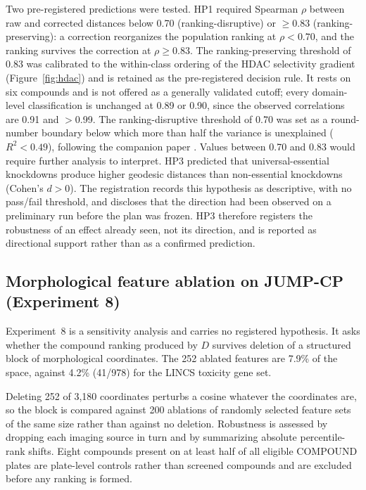 \documentclass[11pt]{article}
\begin{document}
Two pre-registered predictions were tested.
HP1 required Spearman $\rho$ between raw and corrected distances below
0.70 (ranking-disruptive) or $\geq 0.83$ (ranking-preserving): a
correction reorganizes the population ranking at $\rho < 0.70$, and the
ranking survives the correction at $\rho \geq 0.83$. The ranking-preserving threshold of
0.83 was calibrated to the within-class ordering of the HDAC selectivity
gradient (Figure~\ref{fig:hdac}) and is retained as the pre-registered
decision rule. It rests on six compounds and is not offered as a generally
validated cutoff; every domain-level classification is unchanged at 0.89
or 0.90, since the observed correlations are 0.91 and $>$0.99. The ranking-disruptive threshold of 0.70 was set as a
round-number boundary below which more than half the variance is
unexplained ($R^2 < 0.49$), following the companion paper
\citep{tower2026drug}. Values between 0.70 and 0.83 would require
further analysis to interpret.
HP3 predicted that universal-essential knockdowns produce higher geodesic
distances than non-essential knockdowns (Cohen's $d > 0$). The registration
records this hypothesis as descriptive, with no pass/fail threshold, and
discloses that the direction had been observed on a preliminary run before
the plan was frozen. HP3 therefore registers the robustness of an effect
already seen, not its direction, and is reported as directional support
rather than as a confirmed prediction.

\subsection{Morphological feature ablation on JUMP-CP (Experiment 8)}

Experiment~8 is a sensitivity analysis and carries no registered hypothesis.
It asks whether the compound ranking produced by $D$ survives deletion of a
structured block of morphological coordinates. The 252 ablated features are
7.9\% of the space, against 4.2\% (41/978) for the LINCS toxicity gene set.

Deleting 252 of 3{,}180 coordinates perturbs a cosine whatever the
coordinates are, so the block is compared against 200 ablations of randomly
selected feature sets of the same size rather than against no deletion.
Robustness is assessed by dropping each imaging source in turn and by
summarizing absolute percentile-rank shifts. Eight compounds present on at
least half of all eligible COMPOUND plates are plate-level controls rather
than screened compounds and are excluded before any ranking is formed.
\end{document}
